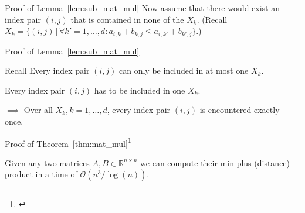 \begin{frame}{Proof of Lemma~\ref{lem:sub_mat_mul}}
    Now assume that there would exist an index pair $(i, j)$ that is contained in none of the $X_k$.
    (Recall $X_k = \{ (i, j) \,|\, \forall k' = 1, \dots, d: a_{i, k} + b_{k, j} \leq a_{i, k'} + b_{k', j} \}$.)
    


    
\end{frame}

\begin{frame}{Proof of Lemma~\ref{lem:sub_mat_mul}}
    \begin{alertblock}{Recall}
        Every index pair $(i, j)$ can only be included in at most one $X_k$.

        Every index pair $(i, j)$ has to be included in one $X_k$.
    \end{alertblock}
    
    $\implies$ Over all $X_k, k = 1, \dots, d$, every index pair $(i, j)$ is encountered exactly once.

\end{frame}

\begin{frame}{Proof of Theorem~\ref{thm:mat_mul}\footnote[1]{\cite[Theorem~3.2]{Chan2007}}}
    \setcounter{theorem}{2}
    \begin{theorem}
        Given any two matrices $A, B \in \mathbb{R}^{n \times n}$ we can compute their min-plus (distance) product in a time of $\mathcal{O}\left( n^3 / \log(n) \right)$.
    \end{theorem}
\end{frame}

